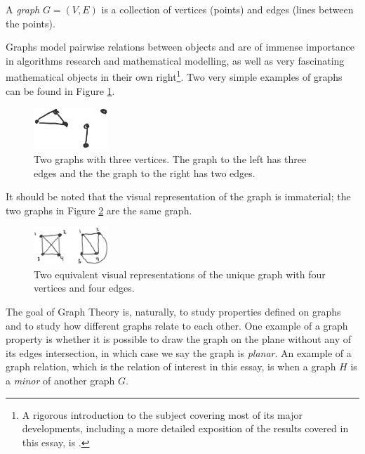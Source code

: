 \begin{definition}[Informal]
A \emph{graph} $G = (V,E)$ is a collection of vertices (points) and edges (lines between the points).
\end{definition}
Graphs model pairwise relations between objects and are of immense importance in algorithms research and mathematical modelling, as well as very fascinating mathematical objects in their own right\footnote{A rigorous introduction to the subject covering most of its major developments, including a more detailed exposition of the results covered in this essay, is \cite{diestelGraphTheory2017}.}. Two very simple examples of graphs can be found in Figure \ref{fig:graphs1}.
\begin{figure}[h!]
  \begin{center}
    \includegraphics[width = 0.25\textwidth]{graf2.png}
  \end{center}
    \caption{Two graphs with three vertices. The graph to the left has three edges and the the graph to the right has two edges.}

  \label{fig:graphs1}
\end{figure}


It should be noted that the visual representation of the graph is immaterial; the two graphs in Figure \ref{fig:graphs2} are the same graph.
\begin{figure}[h!]
  \begin{center}
    \includegraphics[width = 0.25\textwidth]{graf.png}
  \end{center}
    \caption{Two equivalent visual representations of the unique graph with four vertices and four edges.}

  \label{fig:graphs2}
\end{figure}

The goal of Graph Theory is, naturally, to study properties defined on graphs and to study how different graphs relate to each other. One example of a graph property is whether it is possible to draw the graph on the plane without any of its edges intersection, in which case we say the graph is \emph{planar}. An example of a graph relation, which is the relation of interest in this essay, is when a graph $H$ is a \emph{minor} of another graph $G$.

